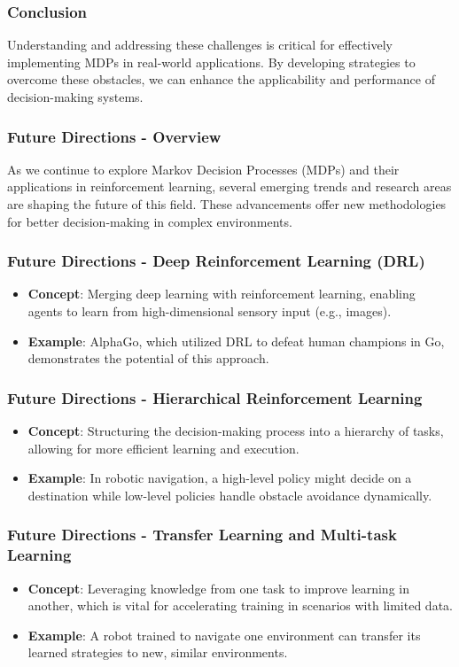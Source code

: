\documentclass[aspectratio=169]{beamer}
\begin{document}
\begin{frame}[fragile]
    \frametitle{Conclusion}
    Understanding and addressing these challenges is critical for effectively implementing MDPs in real-world applications. By developing strategies to overcome these obstacles, we can enhance the applicability and performance of decision-making systems.
\end{frame}

\begin{frame}[fragile]
    \frametitle{Future Directions - Overview}
    As we continue to explore Markov Decision Processes (MDPs) and their applications in reinforcement learning, several emerging trends and research areas are shaping the future of this field. These advancements offer new methodologies for better decision-making in complex environments.
\end{frame}

\begin{frame}[fragile]
    \frametitle{Future Directions - Deep Reinforcement Learning (DRL)}
    \begin{itemize}
        \item \textbf{Concept}: Merging deep learning with reinforcement learning, enabling agents to learn from high-dimensional sensory input (e.g., images).
        \item \textbf{Example}: AlphaGo, which utilized DRL to defeat human champions in Go, demonstrates the potential of this approach.
    \end{itemize}
\end{frame}

\begin{frame}[fragile]
    \frametitle{Future Directions - Hierarchical Reinforcement Learning}
    \begin{itemize}
        \item \textbf{Concept}: Structuring the decision-making process into a hierarchy of tasks, allowing for more efficient learning and execution.
        \item \textbf{Example}: In robotic navigation, a high-level policy might decide on a destination while low-level policies handle obstacle avoidance dynamically.
    \end{itemize}
\end{frame}

\begin{frame}[fragile]
    \frametitle{Future Directions - Transfer Learning and Multi-task Learning}
    \begin{itemize}
        \item \textbf{Concept}: Leveraging knowledge from one task to improve learning in another, which is vital for accelerating training in scenarios with limited data.
        \item \textbf{Example}: A robot trained to navigate one environment can transfer its learned strategies to new, similar environments.
    \end{itemize}
\end{frame}
\end{document}
